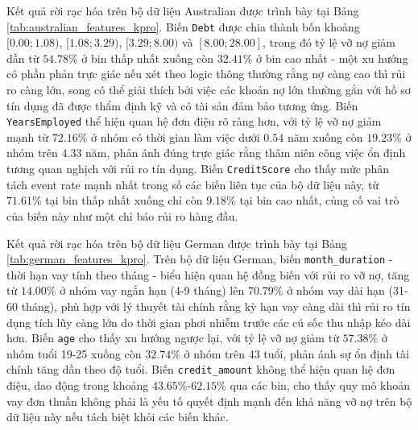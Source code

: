 Kết quả rời rạc hóa trên bộ dữ liệu Australian được trình bày tại Bảng \ref{tab:australian_features_kpro}. Biến \texttt{Debt} được chia thành bốn khoảng $[0.00; 1.08)$, $[1.08; 3.29)$, $[3.29; 8.00)$ và $[8.00; 28.00]$, trong đó tỷ lệ vỡ nợ giảm dần từ $54.78\%$ ở bin thấp nhất xuống còn $32.41\%$ ở bin cao nhất - một xu hướng có phần phản trực giác nếu xét theo logic thông thường rằng nợ càng cao thì rủi ro càng lớn, song có thể giải thích bởi việc các khoản nợ lớn thường gắn với hồ sơ tín dụng đã được thẩm định kỹ và có tài sản đảm bảo tương ứng. Biến \texttt{YearsEmployed} thể hiện quan hệ đơn điệu rõ ràng hơn, với tỷ lệ vỡ nợ giảm mạnh từ $72.16\%$ ở nhóm có thời gian làm việc dưới $0.54$ năm xuống còn $19.23\%$ ở nhóm trên $4.33$ năm, phản ánh đúng trực giác rằng thâm niên công việc ổn định tương quan nghịch với rủi ro tín dụng. Biến \texttt{CreditScore} cho thấy mức phân tách event rate mạnh nhất trong số các biến liên tục của bộ dữ liệu này, từ $71.61\%$ tại bin thấp nhất xuống chỉ còn $9.18\%$ tại bin cao nhất, củng cố vai trò của biến này như một chỉ báo rủi ro hàng đầu.

Kết quả rời rạc hóa trên bộ dữ liệu German được trình bày tại Bảng \ref{tab:german_features_kpro}. Trên bộ dữ liệu German, biến \texttt{month\_duration} - thời hạn vay tính theo tháng - biểu hiện quan hệ đồng biến với rủi ro vỡ nợ, tăng từ $14.00\%$ ở nhóm vay ngắn hạn (4-9 tháng) lên $70.79\%$ ở nhóm vay dài hạn (31-60 tháng), phù hợp với lý thuyết tài chính rằng kỳ hạn vay càng dài thì rủi ro tín dụng tích lũy càng lớn do thời gian phơi nhiễm trước các cú sốc thu nhập kéo dài hơn. Biến \texttt{age} cho thấy xu hướng ngược lại, với tỷ lệ vỡ nợ giảm từ $57.38\%$ ở nhóm tuổi 19-25 xuống còn $32.74\%$ ở nhóm trên 43 tuổi, phản ánh sự ổn định tài chính tăng dần theo độ tuổi. Biến \texttt{credit\_amount} không thể hiện quan hệ đơn điệu, dao động trong khoảng $43.65\%$-$62.15\%$ qua các bin, cho thấy quy mô khoản vay đơn thuần không phải là yếu tố quyết định mạnh đến khả năng vỡ nợ trên bộ dữ liệu này nếu tách biệt khỏi các biến khác.

